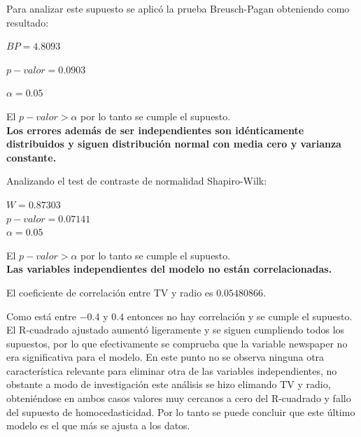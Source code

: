 \documentclass[12pt,a4paper]{article}
\begin{document}
	Para analizar este supuesto se aplicó la prueba Breusch-Pagan obteniendo como resultado:
	
	\begin{center}
		$BP = 4.8093$
		
		$p-valor = 0.0903$
		
		$\alpha = 0.05$
	\end{center}

	El $p-valor > \alpha$ por lo tanto se cumple el supuesto.\\
	
	\textbf{Los errores además de ser independientes son idénticamente distribuidos y siguen distribución normal con media cero y varianza constante.}
	
	Analizando el test de contraste de normalidad Shapiro-Wilk:
	\begin{center}
		$W = 0.87303$ \\
		$p-valor = 0.07141$\\
		$\alpha = 0.05$
	\end{center}

	El $p-valor > \alpha$ por lo tanto se cumple el supuesto.\\
	
	\textbf{Las variables independientes del modelo no están correlacionadas.}
	
	El coeficiente de correlación entre TV y radio es $0.05480866$.
	
	Como está entre $-0.4$ y $0.4$ entonces no hay correlación y se cumple el supuesto.\\
	
	El R-cuadrado ajustado aumentó ligeramente y se siguen cumpliendo todos los supuestos, por lo que efectivamente se comprueba que la variable newspaper no era significativa para el modelo. En este punto no se observa ninguna otra característica relevante para eliminar otra de las variables independientes, no obstante a modo de investigación este análisis se hizo elimando TV y radio, obteniéndose en ambos casos valores muy cercanos a cero del R-cuadrado y fallo del supuesto de homocedasticidad. Por lo tanto se puede concluir que este último modelo es el que más se ajusta a los datos.\\
	
	
	
		
\end{document}

